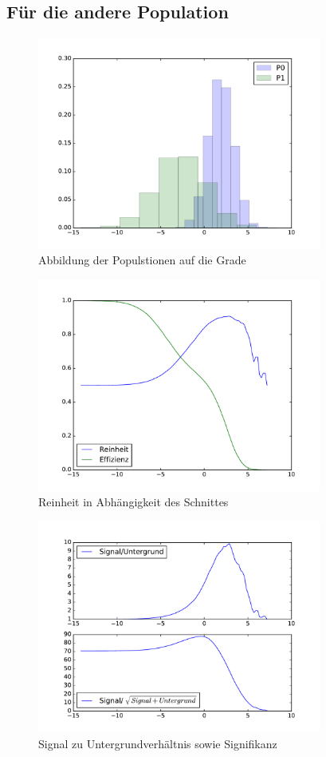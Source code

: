 \subsection*{Für die andere Population}

\begin{figure}[H]
  \centering
  \includegraphics[height=7cm]{./Figures/secondHist.pdf}
  \caption{Abbildung der Populstionen auf die Grade}
\end{figure}

\begin{figure}[H]
  \centering
  \includegraphics[height=7cm]{./Figures/reinheit2.pdf}
  \caption{Reinheit in Abhängigkeit des Schnittes}
\end{figure}

\begin{figure}[H]
  \centering
  \includegraphics[height=7cm]{./Figures/SigZuUnt2.pdf}
  \caption{Signal zu Untergrundverhältnis sowie Signifikanz}
\end{figure}


